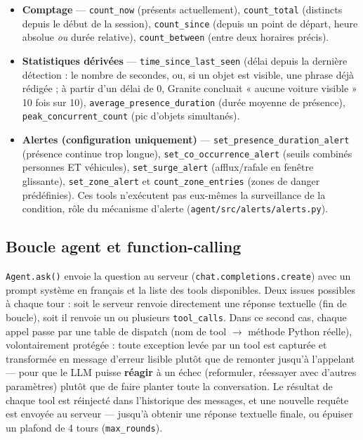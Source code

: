 \documentclass[11pt,a4paper]{article}
\let\Oldsubsection\subsection
\renewcommand{\subsection}{\FloatBarrier\Oldsubsection}
\begin{document}
    \begin{itemize}[leftmargin=1.5em]
      \item \textbf{Comptage} --- \texttt{count\_now} (présents
        actuellement), \texttt{count\_total} (distincts depuis le début de
        la session), \texttt{count\_since} (depuis un point de départ,
        heure absolue \emph{ou} durée relative), \texttt{count\_between}
        (entre deux horaires précis).
      \item \textbf{Statistiques dérivées} --- \texttt{time\_since\_last\_seen}
        (délai depuis la dernière détection : le nombre de secondes, ou,
        si un objet est visible, une phrase déjà rédigée ; à partir d'un
        délai de 0, Granite concluait « aucune voiture visible » 10 fois
        sur 10), \texttt{average\_presence\_duration}
        (durée moyenne de présence), \texttt{peak\_concurrent\_count} (pic
        d'objets simultanés).
      \item \textbf{Alertes (configuration uniquement)} ---
        \texttt{set\_presence\_duration\_alert} (présence continue trop
        longue), \texttt{set\_co\_occurrence\_alert} (seuils combinés
        personnes ET véhicules), \texttt{set\_surge\_alert} (afflux/rafale
        en fenêtre glissante), \texttt{set\_zone\_alert} et
        \texttt{count\_zone\_entries} (zones de danger prédéfinies). Ces tools
        n'exécutent pas eux-mêmes la surveillance de la condition, rôle du
        mécanisme d'alerte (\texttt{agent/src/alerts/alerts.py}).
    \end{itemize}
    
    \subsection{Boucle agent et function-calling}
    
    \texttt{Agent.ask()} envoie la question au serveur
    (\texttt{chat.completions.create}) avec un
    prompt système en français et la liste des tools disponibles. Deux
    issues possibles à chaque tour : soit le serveur renvoie directement une
    réponse textuelle (fin de boucle), soit il renvoie un ou plusieurs
    \texttt{tool\_calls}. Dans ce second cas, chaque appel passe par une
    table de dispatch (nom de tool $\to$ méthode Python réelle),
    volontairement protégée : toute exception levée par un tool est
    capturée et transformée en message d'erreur lisible plutôt que de
    remonter jusqu'à l'appelant --- pour que le LLM puisse \textbf{réagir}
    à un échec (reformuler, réessayer avec d'autres paramètres) plutôt que
    de faire planter toute la conversation. Le résultat de chaque tool est
    réinjecté dans l'historique des messages, et une nouvelle requête est
    envoyée au serveur --- jusqu'à obtenir une réponse textuelle finale, ou
    épuiser un plafond de 4 tours (\texttt{max\_rounds}).
    
\end{document}
